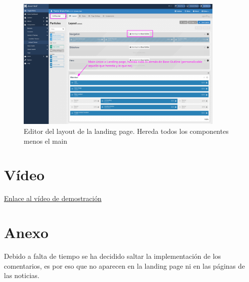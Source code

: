 \documentclass[a4paper]{article}
\begin{document}
\begin{figure}[H]
    \centering
    \includegraphics[width=0.9\textwidth]{images/backend-layout-landing-outline.png}
    \captionsetup{width=0.85\textwidth}
    \caption{Editor del layout de la landing page. Hereda todos los componentes menos el main}
\end{figure}


\section{Vídeo}

\href{https://drive.google.com/file/d/1qvQA09GjjR_p3fuuL1GLrYEpJQDwJftM/view?usp=sharing}{Enlace al vídeo de demostración}


\section{Anexo}

Debido a falta de tiempo se ha decidido saltar la implementación de los comentarios, es por eso que no aparecen en la landing page ni en las páginas de las noticias.
\end{document}
